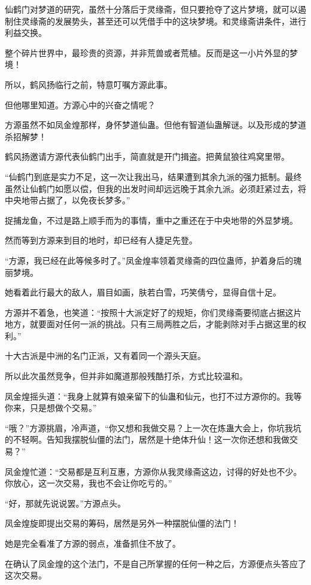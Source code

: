 \begin{this_body}
仙鹤门对梦道的研究，虽然十分落后于灵缘斋，但只要抢夺了这片梦境，就可以遏制住灵缘斋的发展势头，甚至还可以凭借手中的这块梦境。和灵缘斋讲条件，进行利益交换。

整个碎片世界中，最珍贵的资源，并非荒兽或者荒植。反而是这一小片外显的梦境！

所以，鹤风扬临行之前，特意叮嘱方源此事。

但他哪里知道。方源心中的兴奋之情呢？

方源虽然不如凤金煌那样，身怀梦道仙蛊。但他有智道仙蛊解谜。以及形成的梦道杀招解梦！

鹤风扬邀请方源代表仙鹤门出手，简直就是开门揖盗。把黄鼠狼往鸡窝里带。

“仙鹤门到底是实力不足，这一次让我出马，结果遭到其余九派的强力抵制。最终虽然让仙鹤门如愿以偿，但我的出发时间却远远晚于其余九派。必须赶紧过去，将中央地带占据了，以免夜长梦多。”

捉捕龙鱼，不过是路上顺手而为的事情，重中之重还在于中央地带的外显梦境。

然而等到方源来到目的地时，却已经有人捷足先登。

“方源，我已经在此等候多时了。”凤金煌率领着灵缘斋的四位蛊师，护着身后的瑰丽梦境。

她看着此行最大的敌人，眉目如画，肤若白雪，巧笑倩兮，显得自信十足。

方源并不着急，也笑道：“按照十大派定好了的规矩，你们灵缘斋要彻底占据这片地方，就要面对任何一派的挑战。只有三局两胜之后，才能剥除对手占据这里的权利。”

十大古派是中洲的名门正派，又有着同一个源头天庭。

所以此次虽然竞争，但并非如魔道那般残酷打杀，方式比较温和。

凤金煌摇头道：“我身上就算有娘亲留下的仙蛊和仙元，也打不过方源你的。我等你来，只是想做个交易。”

“哦？”方源挑眉，冷声道，“你又想和我做交易？上一次在炼蛊大会上，你坑我坑的不轻啊。告知我摆脱仙僵的法门，居然是十绝体升仙！这一次你还想和我做交易？”

凤金煌忙道：“交易都是互利互惠，方源你从我灵缘斋这边，讨得的好处也不少。你放心，这一次交易，我也不会让你吃亏的。”

“好，那就先说说罢。”方源点头。

凤金煌旋即提出交易的筹码，居然是另外一种摆脱仙僵的法门！

她是完全看准了方源的弱点，准备抓住不放了。

在确认了凤金煌的这个法门，不是自己所掌握的任何一种之后，方源便点头答应了这次交易。


\end{this_body}
